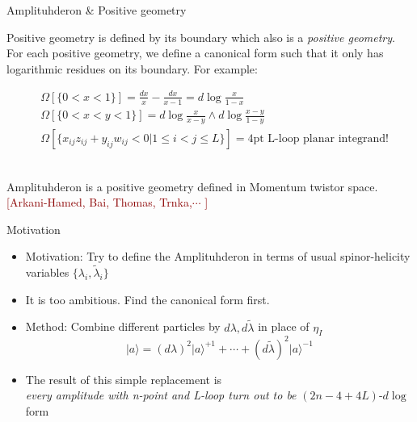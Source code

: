 \documentclass[10pt]{beamer}
\begin{document}
\begin{frame}{Amplituhderon \& Positive geometry}

  Positive geometry is defined by its boundary which also is a \emph{positive geometry}. For each positive geometry, we define a canonical form  such that it only has logarithmic residues on its boundary.
  For example:
  \begin{tcolorbox}
  \begin{align*}
    &\Omega[\{0<x<1\}]=\frac{dx}{x}-\frac{dx}{x-1}=d\log\frac{x}{1-x}\\
    &\Omega[\{0<x<y<1\}]=d\log\frac{x}{x-y}\wedge d\log\frac{x-y}{1-y}\\
    &\Omega[\{x_{ij}z_{ij}+y_{ij}w_{ij}<0\vert 1\leq i<j\leq L\}] = \text{4pt L-loop planar integrand!} 
  \end{align*} 
\end{tcolorbox}
\\
  Amplituhderon is a positive geometry defined in Momentum twistor space. \\
  \footnotesize{\textcolor{darkred}{[Arkani-Hamed, Bai, Thomas, Trnka,$\cdots$ ]}}
\end{frame}


\begin{frame}{Motivation}
\begin{itemize}[<+->]
  \item  Motivation: Try to define the Amplituhderon in terms of usual spinor-helicity variables $\{\lambda_{i},\tilde{\lambda}_{i}\}$ 
  \item It is too ambitious. Find the canonical form first.
  \item Method: Combine different particles by $d\lambda,d\tilde{\lambda}$ in place of $\eta_{I}$
   \begin{equation*}
    \vert a\rangle
     = (d\lambda)^{2}\vert a \rangle^{+1}+\cdots+(d\tilde{\lambda})^{2}\vert a\rangle^{-1}
  \end{equation*}
   \item The result of this simple replacement is \\
  \emph{every amplitude with n-point and L-loop turn out to be} $(2n-4+4L)$-$d\log$ form  
  \end{itemize}
   
\end{frame}
\end{document}
